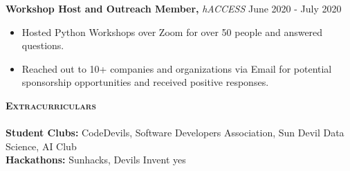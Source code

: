 \documentclass[a4paper]{article}
\newcommand{\lineunder} {
    \vspace*{-8pt} \\
    \hspace*{-18pt} \hrulefill \\
}
\newcommand{\header} [1] {
    {\hspace*{-15pt}\vspace*{3pt} \textsc{#1}}
    \vspace*{-6pt} \lineunder
}
\begin{document}
\textbf{Workshop Host and Outreach Member, }\textit{hACCESS}  \hfill June 2020 - July 2020\\
\vspace{-3mm}
\begin{itemize} \itemsep 1pt
    \itemsep-0.05em
	\item Hosted Python Workshops over Zoom for over 50 people and answered questions.
	\item Reached out to 10+ companies and organizations via Email for potential sponsorship opportunities and received positive responses.
\end{itemize}

\vspace{-2mm}


\header{\textbf{Extracurriculars}}


\textbf{Student Clubs:} CodeDevils, Software Developers Association, Sun Devil Data Science, AI Club \\
\textbf{Hackathons:} Sunhacks, Devils Invent yes



\vspace{-50mm}
    
\end{document}
